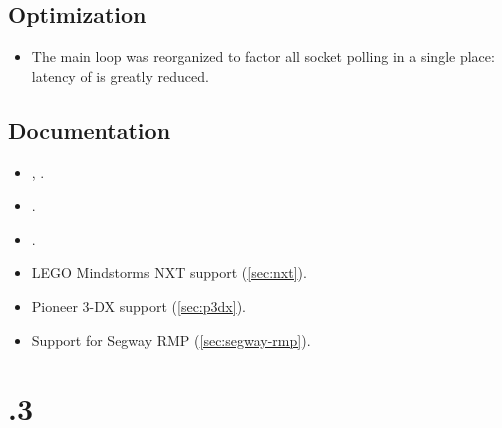 \subsection{Optimization}
\begin{itemize}
\item The main loop was reorganized to factor all socket polling in a single
  place: latency of  is greatly reduced.
\end{itemize}

\subsection{Documentation}
\begin{itemize}
\item {},  .
\item {}.
\item {}.
\item LEGO Mindstorms NXT support (\autoref{sec:nxt}).
\item Pioneer 3-DX support (\autoref{sec:p3dx}).
\item Support for Segway RMP (\autoref{sec:segway-rmp}).
\end{itemize}


\section{.3}

